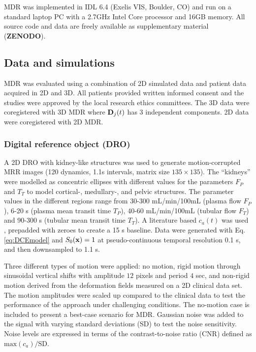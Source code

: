 \documentclass[num-refs]{wiley-article}
\newcommand{\x}{{\bf x}}
\newcommand{\D}{{\bf D}}
\newcommand{\ca}{c_a}
\begin{document}
MDR was implemented in IDL 6.4 (Exelis VIS, Boulder, CO) and run on a standard laptop PC with a 2.7GHz Intel Core processor and 16GB memory. All source code and data are freely available as supplementary material ({\bf ZENODO}). 

\subsection{Data and simulations}

MDR was evaluated using a combination of 2D simulated data and patient data acquired in 2D and 3D. All patients provided written informed consent and the studies were approved by the local research ethics committees. The 3D data were coregistered with 3D MDR where $\D_j(t)$ has 3 independent components. 2D data were coregistered with 2D MDR.

\subsubsection{Digital reference object (DRO)}

A 2D DRO with kidney-like structures was used to generate motion-corrupted MRR images (120 dynamics, 1.1s intervals, matrix size $135\times135$). The ``kidneys'' were modelled as concentric ellipses with different values for the parameters $F_P$ and $T_T$ to model cortical-, medullary-, and pelvic structures. The parameter values in the different regions range from 30-300 mL/min/100mL (plasma flow $F_P$), 6-20 s (plasma mean transit time $T_P$), 40-60 mL/min/100mL (tubular flow $F_T$) and 90-300 s (tubular mean transit time $T_T$). A literature based $\ca(t)$ was used \cite{Parker2006}, prepadded with zeroes to create a 15 s baseline. Data were generated with Eq. \ref{eq:DCEmodel} and $S_0(\x)=1$ at pseudo-continuous temporal resolution 0.1 s, and then downsampled to 1.1 s. 

Three different types of motion were applied: no motion, rigid motion through sinusoidal vertical shifts with amplitude $12$ pixels and period $4$ sec, and non-rigid motion derived from the deformation fields measured on a 2D clinical data set. The motion amplitudes were scaled up compared to the clinical data to test the performance of the approach under challenging conditions. The no-motion case is included to present a best-case scenario for MDR. Gaussian noise was added to the signal with varying standard deviations (SD) to test the noise sensitivity. Noise levels are expressed in terms of the contrast-to-noise ratio (CNR) defined as $\text{max}(\ca)/\text{SD}$. 
\end{document}
